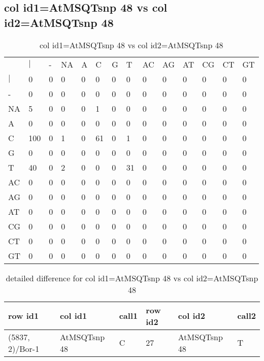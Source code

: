 \subsection{col id1=AtMSQTsnp 48 vs col id2=AtMSQTsnp 48}
\begin{center}
\begin{longtable}{|l|l|l|l|l|l|l|l|l|l|l|l|l|l|}
\caption{col id1=AtMSQTsnp 48 vs col id2=AtMSQTsnp 48} \label{table_dm736}\\
\hline
\\
\hline
&$|$&-&NA&A&C&G&T&AC&AG&AT&CG&CT&GT\\
$|$&0&0&0&0&0&0&0&0&0&0&0&0&0\\
-&0&0&0&0&0&0&0&0&0&0&0&0&0\\
NA&5&0&0&0&1&0&0&0&0&0&0&0&0\\
A&0&0&0&0&0&0&0&0&0&0&0&0&0\\
C&100&0&1&0&61&0&1&0&0&0&0&0&0\\
G&0&0&0&0&0&0&0&0&0&0&0&0&0\\
T&40&0&2&0&0&0&31&0&0&0&0&0&0\\
AC&0&0&0&0&0&0&0&0&0&0&0&0&0\\
AG&0&0&0&0&0&0&0&0&0&0&0&0&0\\
AT&0&0&0&0&0&0&0&0&0&0&0&0&0\\
CG&0&0&0&0&0&0&0&0&0&0&0&0&0\\
CT&0&0&0&0&0&0&0&0&0&0&0&0&0\\
GT&0&0&0&0&0&0&0&0&0&0&0&0&0\\
\hline
\end{longtable}
\end{center}

\begin{center}
\begin{longtable}{|l|l|l|l|l|l|}
\caption{detailed difference for col id1=AtMSQTsnp 48 vs col id2=AtMSQTsnp 48} \label{table_dm737}\\
\hline
row id1&col id1&call1&row id2&col id2&call2\\
\hline
(5837, 2)/Bor-1&AtMSQTsnp 48&C&27&AtMSQTsnp 48&T\\
\hline
\end{longtable}
\end{center}

